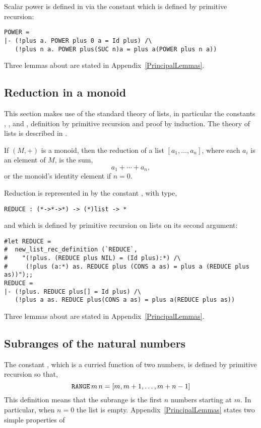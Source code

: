 Scalar power is defined in \HOL{} via the constant \verb@POWER@ which
is defined by primitive recursion:
\begin{session}
\begin{verbatim}
POWER =
|- (!plus a. POWER plus 0 a = Id plus) /\
   (!plus n a. POWER plus(SUC n)a = plus a(POWER plus n a))
\end{verbatim}
\end{session}
Three lemmas about \verb@POWER@ are stated in Appendix~\ref{PrincipalLemmas}.

\subsection{Reduction in a monoid}

This section makes use of the standard \HOL{} theory of lists, in particular
the constants \verb@NIL@, \verb@CONS@, \verb@APPEND@ and \verb@MAP@,
definition by primitive recursion and proof by induction. The theory of
lists is described in \DESCRIPTION.

If $(M,+)$ is a monoid, then the reduction of a list $[a_1,\ldots,a_n]$,
where each $a_i$ is an element of $M$, is the sum,
\[
a_1 + \cdots + a_n,
\]
or the monoid's identity element if $n=0$.

Reduction is represented in \HOL{} by the constant \verb@REDUCE@,
with type,
\begin{verbatim}
REDUCE : (*->*->*) -> (*)list -> *
\end{verbatim}
and which is defined by primitive recursion on lists on its second argument:
\begin{session}
\begin{verbatim}
#let REDUCE =
#  new_list_rec_definition (`REDUCE`,
#    "(!plus. (REDUCE plus NIL) = (Id plus):*) /\
#     (!plus (a:*) as. REDUCE plus (CONS a as) = plus a (REDUCE plus as))");;
REDUCE =
|- (!plus. REDUCE plus[] = Id plus) /\
   (!plus a as. REDUCE plus(CONS a as) = plus a(REDUCE plus as))
\end{verbatim}
\end{session}
Three lemmas about \verb@REDUCE@ are stated in Appendix~\ref{PrincipalLemmas}.

\subsection{Subranges of the natural numbers}

The constant \verb@RANGE@, which is a curried function of two numbers,
is defined by primitive recursion so that,
\[
\verb@RANGE@\,m\,n = [m, m+1, \ldots, m+n-1]
\]
This definition means that the subrange is the first $n$ numbers starting
at $m$.  In particular, when $n=0$ the list is empty.
Appendix~\ref{PrincipalLemmas} states two simple properties of \verb@RANGE@

